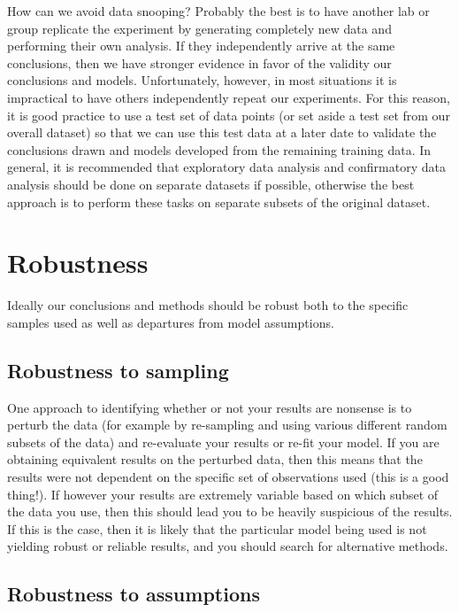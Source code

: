 How can we avoid data snooping? Probably the best is to have another lab or group replicate the experiment by generating completely new data and performing their own analysis. If they independently arrive at the same conclusions, then we have stronger evidence in favor of the validity our conclusions and models. Unfortunately, however, in most situations it is impractical to have others independently repeat our experiments. For this reason, it is good practice to use a test set of data points (or set aside a test set from our overall dataset) so that we can use this test data at a later date to validate the conclusions drawn and models developed from the remaining training data. In general, it is recommended that exploratory data analysis and confirmatory data analysis should be done on separate datasets if possible, otherwise the best approach is to perform these tasks on separate subsets of the original dataset.



\section{Robustness}

Ideally our conclusions and methods should be robust both to the specific samples used as well as departures from model assumptions.

\subsection*{Robustness to sampling}

One approach to identifying whether or not your results are nonsense is to perturb the data (for example by re-sampling and using various different random subsets of the data) and re-evaluate your results or re-fit your model. If you are obtaining equivalent results on the perturbed data, then this means that the results were not dependent on the specific set of observations used (this is a good thing!). If however your results are extremely variable based on which subset of the data you use, then this should lead you to be heavily suspicious of the results. If this is the case, then it is likely that the particular model being used is not yielding robust or reliable results, and you should search for alternative methods.

\subsection*{Robustness to assumptions}

